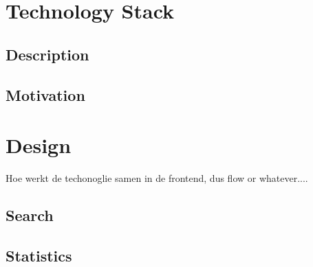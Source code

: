 \section{Technology Stack}

	\subsection{Description}

	\subsection{Motivation}

\section{Design}
	Hoe werkt de techonoglie samen in de frontend, dus flow or whatever....

	\subsection{Search}

	\subsection{Statistics}